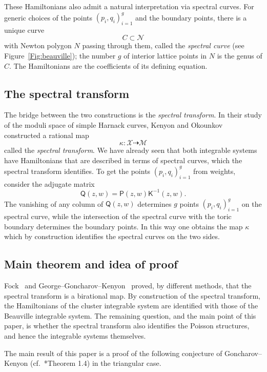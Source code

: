 \documentclass[dvipsnames,11pt]{article}
\theoremstyle{definition}
\def\K{\mathsf K}
\begin{document}
These Hamiltonians also admit a natural interpretation via spectral curves. For generic choices of the points $(p_i,q_i)_{i=1}^g$ and the boundary points, there is a unique curve
\[
C\subset \mathcal N
\]
with Newton polygon $N$ passing through them, called the \emph{spectral curve} (see Figure~\ref{Fig:beauville}); the number $g$ of interior lattice points in $N$ is the genus of $C$. The Hamiltonians are the coefficients of its defining equation.

\subsection{The spectral transform}

The bridge between the two constructions is the \emph{spectral transform}. In their study of the moduli space of simple Harnack curves, Kenyon and Okounkov~\cite{KO} constructed a rational map
\[
\kappa:\mathcal X \dashrightarrow \mathcal M
\]
called the \emph{spectral transform}. We have already seen that both integrable systems have Hamiltonians that are described in terms of spectral curves, which the spectral transform identifies. To get the points $(p_i,q_i)_{i=1}^g$ from weights, consider the adjugate matrix
\[
\mathsf Q(z,w)=\mathsf P(z,w)\K^{-1}(z,w).
\]
The vanishing of any column of $\mathsf Q(z,w)$ determines $g$ points $(p_i,q_i)_{i=1}^g$ on the spectral curve, while the intersection of the spectral curve with the toric boundary determines the boundary points. In this way one obtains the map $\kappa$ which by construction identifies the spectral curves on the two sides.

\subsection{Main theorem and idea of proof}

Fock~\cite{Fock} and George--Goncharov--Kenyon~\cite{GGK} proved, by different methods, that the spectral transform is a birational map. By construction of the spectral transform, the Hamiltonians of the cluster integrable system are identified with those of the Beauville integrable system. The remaining question, and the main point of this paper, is whether the spectral transform also identifies the Poisson structures, and hence the integrable systems themselves.

The main result of this paper is a proof of the following conjecture of Goncharov--Kenyon (cf.~\cite{GK13}*{Theorem 1.4}) in the triangular case.
\end{document}
